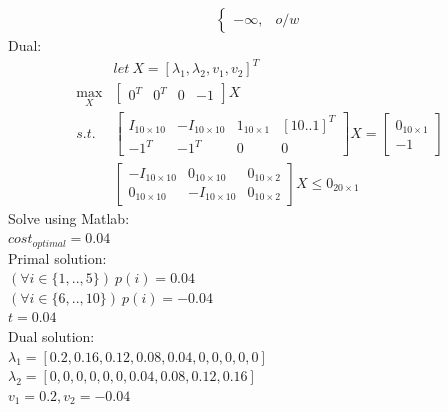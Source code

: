\documentclass[12pt,letter]{article}
\begin{document}
\begin{enumerate}
\begin{enumerate}
\begin{align*}
\begin{cases}
                           -\infty, & o/w
                         \end{cases}
    \end{align*}
    Dual:
    \begin{align*}
      &let\ X = [\lambda_1,\lambda_2,v_1,v_2]^T\\
      \max_{X} &
                 \begin{bmatrix}
                   0^T & 0^T & 0 & -1
                 \end{bmatrix}X\\
      s.t.\ &
              \begin{bmatrix}
                I_{10\times 10} & -I_{10\times 10} & 1_{10\times 1} & [10..1]^T\\
                -1^T & -1^T & 0 & 0
              \end{bmatrix}X =
                                  \begin{bmatrix}
                                    0_{10\times 1}\\
                                    -1
                                  \end{bmatrix}\\
      &\begin{bmatrix}
        -I_{10\times 10} & 0_{10\times 10} & 0_{10\times 2}\\
        0_{10\times 10} & -I_{10\times 10} & 0_{10\times 2}
      \end{bmatrix} X \leq 0_{20\times 1}
    \end{align*}
    Solve using Matlab:\\
    $cost_{optimal}=0.04$\\
    Primal solution:\\
    $(\forall i \in \{1,..,5\})\ p(i)=0.04$\\
    $(\forall i \in \{6,..,10\})\ p(i)=-0.04$\\
    $t=0.04$\\
    
    Dual solution:\\
    $\lambda_1 = [0.2,0.16,0.12,0.08,0.04,0,0,0,0,0]$\\
    $\lambda_2 = [0,0,0,0,0,0,0.04,0.08,0.12,0.16]$\\
    $v_1=0.2, v_2 =-0.04$


\end{enumerate}
\end{enumerate}
\end{document}
